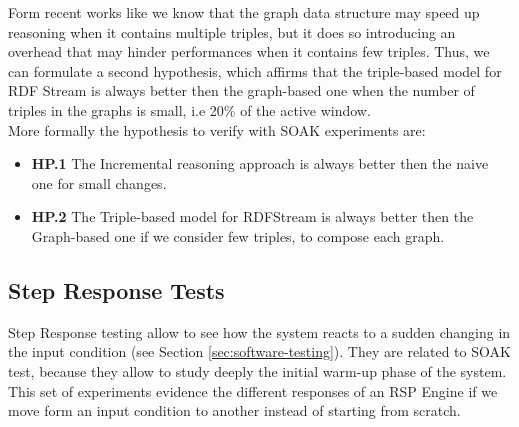 Form recent works like \cite{DBLP:conf/semweb/BalduiniVDTPC13} we know that the graph data structure may speed up reasoning when it contains multiple triples, but it does so introducing an overhead that may hinder performances when it contains few triples. Thus, we can formulate a second hypothesis, which affirms that the triple-based model for RDF Stream is always better then the graph-based one when the number of triples in the graphs is small, i.e 20\% of the active window.\\

More formally the hypothesis to verify with SOAK experiments are:
\begin{itemize}
\item \textbf{HP.1} The Incremental reasoning approach is always better then the naive one for small changes.
\item \textbf{HP.2} The Triple-based model for RDFStream is always better then the Graph-based one if we consider few triples, to compose each graph.
\end{itemize}


\subsection{Step Response Tests}\label{sec:step-es}

Step Response testing allow to see how the system reacts to a sudden changing in the input condition (see Section \ref{sec:software-testing}). They are related to SOAK test, because they allow to study deeply the initial warm-up phase of the system. This set of experiments evidence the different responses of an RSP Engine if we move form an input condition to another instead of starting from scratch.

